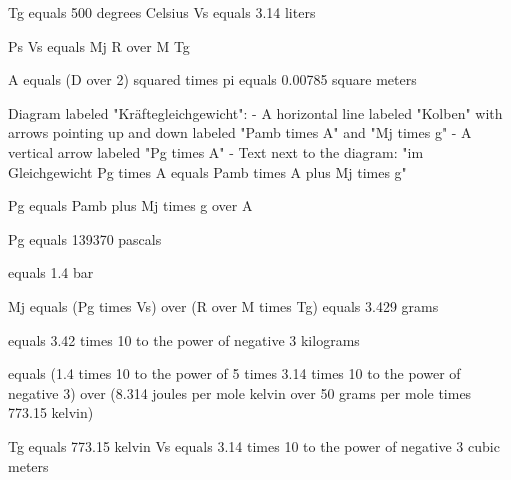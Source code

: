 Tg equals 500 degrees Celsius  
Vs equals 3.14 liters  

Ps Vs equals Mj R over M Tg  

A equals (D over 2) squared times pi equals 0.00785 square meters  

Diagram labeled "Kräftegleichgewicht":  
- A horizontal line labeled "Kolben" with arrows pointing up and down labeled "Pamb times A" and "Mj times g"
- A vertical arrow labeled "Pg times A"
- Text next to the diagram: "im Gleichgewicht Pg times A equals Pamb times A plus Mj times g"

Pg equals Pamb plus Mj times g over A  

Pg equals 139370 pascals  

equals 1.4 bar  

Mj equals (Pg times Vs) over (R over M times Tg) equals 3.429 grams  

equals 3.42 times 10 to the power of negative 3 kilograms  

equals (1.4 times 10 to the power of 5 times 3.14 times 10 to the power of negative 3) over (8.314 joules per mole kelvin over 50 grams per mole times 773.15 kelvin)  

Tg equals 773.15 kelvin  
Vs equals 3.14 times 10 to the power of negative 3 cubic meters